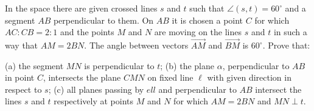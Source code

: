 In the space there are given crossed lines $s$ and $t$ such that $\angle(s,t)=60^\circ$ and a segment $AB$ perpendicular to them. On $AB$ it is chosen a point $C$ for which $AC:CB=2:1$ and the points $M$ and $N$ are moving on the lines $s$ and $t$ in such a way that $AM=2BN$. The angle between vectors $\overrightarrow{AM}$ and $\overrightarrow{BM}$ is $60^\circ$. Prove that:

(a) the segment $MN$ is perpendicular to $t$;
(b) the plane $\alpha$, perpendicular to $AB$ in point $C$, intersects the plane $CMN$ on fixed line $\ell$ with given direction in respect to $s$;
(c) all planes passing by $ell$ and perpendicular to $AB$ intersect the lines $s$ and $t$ respectively at points $M$ and $N$ for which $AM=2BN$ and $MN\perp t$.